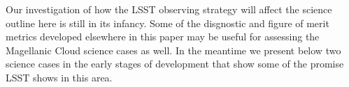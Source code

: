 Our investigation of how the LSST observing strategy will affect the
science outline here is still in its infancy. Some of the disgnostic and
figure of merit metrics developed elsewhere in this paper may be useful
for assessing the Magellanic Cloud science cases as well. In the
meantime we present below two science cases in the early stages of development that show some of the promise LSST shows in this area.




